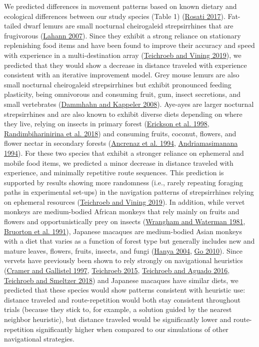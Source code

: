 \documentclass[twoside,12pt,final]{ucthesis-CA2012}
\begin{document}
\begin{ucmainmatter}
We predicted differences in movement patterns based on known dietary and ecological differences between our study species (Table 1) (\protect\hyperlink{ref-rosati2017}{Rosati 2017}). Fat-tailed dwarf lemurs are small nocturnal cheirogaleid strepsirrhines that are frugivorous (\protect\hyperlink{ref-lahann2007}{Lahann 2007}). Since they exhibit a strong reliance on stationary replenishing food items and have been found to improve their accuracy and speed with experience in a multi-destination array (\protect\hyperlink{ref-teichroeb2019a}{Teichroeb and Vining 2019}), we predicted that they would show a decrease in distance traveled with experience consistent with an iterative improvement model. Grey mouse lemurs are also small nocturnal cheirogaleid strepsirrhines but exhibit pronounced feeding plasticity, being omnivorous and consuming fruit, gum, insect secretions, and small vertebrates (\protect\hyperlink{ref-dammhahn2008}{Dammhahn and Kappeler 2008}). Aye-ayes are larger nocturnal strepsirrhines and are also known to exhibit diverse diets depending on where they live, relying on insects in primary forest (\protect\hyperlink{ref-erickson1998}{Erickson et al. 1998}, \protect\hyperlink{ref-randimbiharinirina2018}{Randimbiharinirina et al. 2018}) and consuming fruits, coconut, flowers, and flower nectar in secondary forests (\protect\hyperlink{ref-ancrenaz1994}{Ancrenaz et al. 1994}, \protect\hyperlink{ref-andriamasimanana1994}{Andriamasimanana 1994}). For these two species that exhibit a stronger reliance on ephemeral and mobile food items, we predicted a minor decrease in distance traveled with experience, and minimally repetitive route sequences. This prediction is supported by results showing more randomness (i.e., rarely repeating foraging paths in experimental set-ups) in the navigation patterns of strepsirrhines relying on ephemeral resources (\protect\hyperlink{ref-teichroeb2019a}{Teichroeb and Vining 2019}). In addition, while vervet monkeys are medium-bodied African monkeys that rely mainly on fruits and flowers and opportunistically prey on insects (\protect\hyperlink{ref-wrangham1981}{Wrangham and Waterman 1981}, \protect\hyperlink{ref-bruorton1991}{Bruorton et al. 1991}), Japanese macaques are medium-bodied Asian monkeys with a diet that varies as a function of forest type but generally includes new and mature leaves, flowers, fruits, insects, and fungi (\protect\hyperlink{ref-hanya2004}{Hanya 2004}, \protect\hyperlink{ref-go2010}{Go 2010}). Since vervets have previously been shown to rely strongly on navigational heuristics (\protect\hyperlink{ref-cramer1997}{Cramer and Gallistel 1997}, \protect\hyperlink{ref-teichroeb2015}{Teichroeb 2015}, \protect\hyperlink{ref-teichroeb2016}{Teichroeb and Aguado 2016}, \protect\hyperlink{ref-teichroeb2018}{Teichroeb and Smeltzer 2018}) and Japanese macaques have similar diets, we predicted that these species would show patterns consistent with heuristic use: distance traveled and route-repetition would both stay consistent throughout trials (because they stick to, for example, a solution guided by the nearest neighbor heuristic), but distance traveled would be significantly lower and route-repetition significantly higher when compared to our simulations of other navigational strategies.

\end{ucmainmatter}
\end{document}
